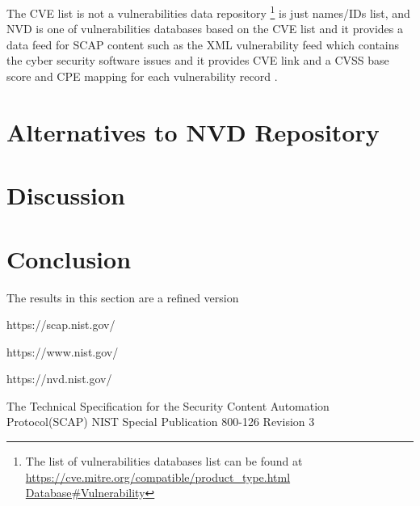 \documentclass{llncs}
\begin{document}
The CVE list is not a vulnerabilities data repository \footnote{The list of vulnerabilities databases list can be found at  \url{https://cve.mitre.org/compatible/product_type.html Database\#Vulnerability}} is just names/IDs list, 
and NVD is one of vulnerabilities databases based on the CVE list and it provides a data feed for SCAP content such as  the XML vulnerability feed which contains the cyber security software issues and it provides CVE link and  a CVSS base score and CPE mapping for each vulnerability record \cite{nvd}.    
\newpage

\section{Alternatives to NVD Repository}


\newpage
\section{Discussion}

\newpage
\section{Conclusion}
The results in this section are a refined version



\begin{thebibliography}{[MT1]}

%

https://scap.nist.gov/

https://www.nist.gov/

https://nvd.nist.gov/


The Technical Specification for the
Security Content Automation Protocol(SCAP)
NIST Special Publication 800-126
Revision 3

%
\end{thebibliography}
\end{document}
